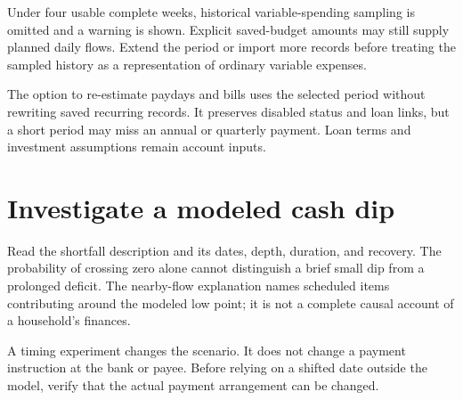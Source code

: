 Under four usable complete weeks, historical variable-spending sampling is omitted and a warning is shown. Explicit saved-budget amounts may still supply planned daily flows. Extend the period or import more records before treating the sampled history as a representation of ordinary variable expenses.

The option to re-estimate paydays and bills uses the selected period without rewriting saved recurring records. It preserves disabled status and loan links, but a short period may miss an annual or quarterly payment. Loan terms and investment assumptions remain account inputs.

\section{Investigate a modeled cash dip}
Read the shortfall description and its dates, depth, duration, and recovery. The probability of crossing zero alone cannot distinguish a brief small dip from a prolonged deficit. The nearby-flow explanation names scheduled items contributing around the modeled low point; it is not a complete causal account of a household's finances.

A timing experiment changes the scenario. It does not change a payment instruction at the bank or payee. Before relying on a shifted date outside the model, verify that the actual payment arrangement can be changed.


